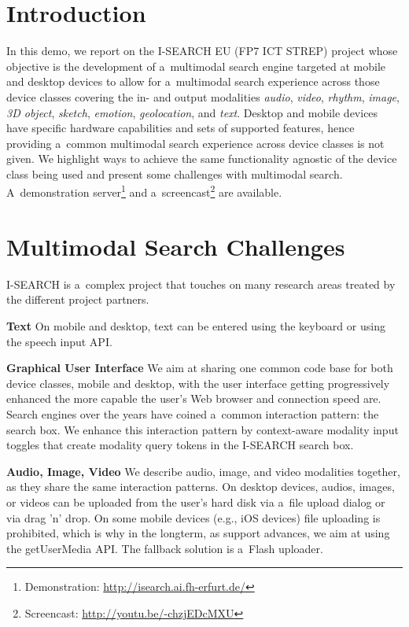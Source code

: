 \documentclass{acm_proc_article-sp}
\let\oldemph\emph
\renewcommand{\emph}[1]{\oldemph{\fontsize{9}{9}\selectfont #1}}
\newcommand{\inlinelistingsize}{\fontsize{8pt}{11pt}}
\let\oldurl\url
\renewcommand{\url}[1]{\inlinelistingsize\oldurl{#1}}
\begin{document}
\section*{Introduction} \label{sec:introduction}
In this demo, we report on the \mbox{I-SEARCH} EU (FP7 ICT STREP) project whose objective is the development of a~multimodal search engine targeted at mobile and desktop devices
to allow for a~multimodal search experience across those device classes covering the
in- and output modalities \emph{audio}, \emph{video}, \emph{rhythm}, \emph{image}, \emph{3D object}, \emph{sketch}, \emph{emotion}, \emph{geolocation}, and \emph{text}.
Desktop and mobile devices have specific hardware capabilities and sets of supported features,
hence providing a~common multimodal search experience across device classes is not given.
We highlight ways to achieve the same functionality agnostic of the device class being used and present some challenges with multimodal search.
A~demonstration server\footnote{Demonstration: \url{http://isearch.ai.fh-erfurt.de/}} and a~screencast\footnote{Screencast: \url{http://youtu.be/-chzjEDcMXU}} are available.

\section*{Multimodal Search Challenges} \label{sec:projectgoals}
\mbox{I-SEARCH} is a~complex project that touches on many research areas treated by the different project partners.

\textbf{Text}
On mobile and desktop, text can be entered using the keyboard or using the speech input API.

\textbf{Graphical User Interface}
We aim at sharing one common code base for both device classes, mobile and desktop, with the user interface getting progressively enhanced the more capable the user's Web browser and connection speed are.
Search engines over the years have coined a~common interaction pattern: the search box.
We enhance this interaction pattern by context-aware modality input toggles that create modality query tokens in the \mbox{I-SEARCH} search box.
\vfill\eject

\textbf{Audio, Image, Video}
We describe audio, image, and video modalities together, as they share the same interaction patterns.
On desktop devices, audios, images, or videos can be uploaded from the user's hard disk via a~file upload dialog or via drag 'n' drop.
On some mobile devices (e.g., iOS devices) file uploading is prohibited, which is why in the longterm, as support advances, we aim at using the getUserMedia API.
The fallback solution is a~Flash uploader.
\end{document}
